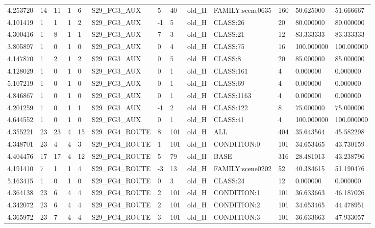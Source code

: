 \begin{tabular}{lllllllllllll}
4.253720 & 14 & 11 & 1 & 6 & S29\_FG3\_AUX & 5 & 40 & old\_H & FAMILY:scene0635 & 160 & 50.625000 & 51.666667 \\
4.101419 & 1 & 1 & 1 & 2 & S29\_FG3\_AUX & -1 & 5 & old\_H & CLASS:26 & 20 & 80.000000 & 80.000000 \\
4.300416 & 1 & 8 & 1 & 1 & S29\_FG3\_AUX & 7 & 3 & old\_H & CLASS:21 & 12 & 83.333333 & 83.333333 \\
3.805897 & 1 & 0 & 1 & 0 & S29\_FG3\_AUX & 0 & 4 & old\_H & CLASS:75 & 16 & 100.000000 & 100.000000 \\
4.147870 & 1 & 2 & 1 & 2 & S29\_FG3\_AUX & 0 & 5 & old\_H & CLASS:8 & 20 & 85.000000 & 85.000000 \\
4.128029 & 1 & 0 & 1 & 0 & S29\_FG3\_AUX & 0 & 1 & old\_H & CLASS:161 & 4 & 0.000000 & 0.000000 \\
5.107219 & 1 & 0 & 1 & 0 & S29\_FG3\_AUX & 0 & 1 & old\_H & CLASS:69 & 4 & 0.000000 & 0.000000 \\
4.846867 & 1 & 0 & 1 & 0 & S29\_FG3\_AUX & 0 & 1 & old\_H & CLASS:1163 & 4 & 0.000000 & 0.000000 \\
4.201259 & 1 & 0 & 1 & 1 & S29\_FG3\_AUX & -1 & 2 & old\_H & CLASS:122 & 8 & 75.000000 & 75.000000 \\
4.644552 & 1 & 0 & 1 & 0 & S29\_FG3\_AUX & 0 & 1 & old\_H & CLASS:41 & 4 & 100.000000 & 100.000000 \\
4.355221 & 23 & 23 & 4 & 15 & S29\_FG4\_ROUTE & 8 & 101 & old\_H & ALL & 404 & 35.643564 & 45.582298 \\
4.348701 & 23 & 4 & 4 & 3 & S29\_FG4\_ROUTE & 1 & 101 & old\_H & CONDITION:0 & 101 & 34.653465 & 43.730159 \\
4.404476 & 17 & 17 & 4 & 12 & S29\_FG4\_ROUTE & 5 & 79 & old\_H & BASE & 316 & 28.481013 & 43.238796 \\
4.191410 & 7 & 1 & 1 & 4 & S29\_FG4\_ROUTE & -3 & 13 & old\_H & FAMILY:scene0202 & 52 & 40.384615 & 51.190476 \\
5.163415 & 1 & 0 & 1 & 0 & S29\_FG4\_ROUTE & 0 & 3 & old\_H & CLASS:24 & 12 & 0.000000 & 0.000000 \\
4.364138 & 23 & 6 & 4 & 4 & S29\_FG4\_ROUTE & 2 & 101 & old\_H & CONDITION:1 & 101 & 36.633663 & 46.187026 \\
4.342072 & 23 & 6 & 4 & 4 & S29\_FG4\_ROUTE & 2 & 101 & old\_H & CONDITION:2 & 101 & 34.653465 & 44.478951 \\
4.365972 & 23 & 7 & 4 & 4 & S29\_FG4\_ROUTE & 3 & 101 & old\_H & CONDITION:3 & 101 & 36.633663 & 47.933057 \\

\end{tabular}
